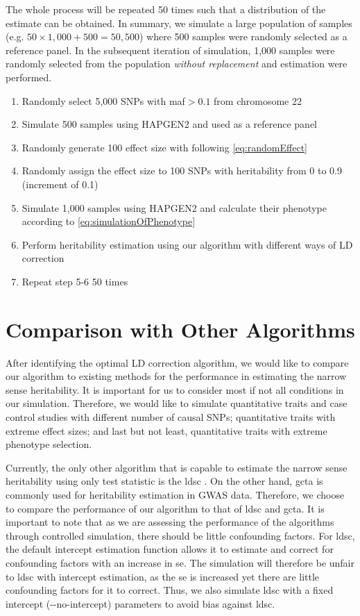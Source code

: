 		The whole process will be repeated 50 times such that a distribution of the estimate can be obtained. 
		In summary, we simulate a large population of samples (e.g. $50\times1,000+500 = 50,500$) where 500 samples were randomly selected as a reference panel. 
		In the subsequent iteration of simulation, 1,000 samples were randomly selected from the population \textit{without replacement} and estimation were performed.
		\begin{enumerate}
			\item Randomly select 5,000 \glspl{SNP} with \gls{maf}$>0.1$ from chromosome 22
			\item Simulate 500 samples using HAPGEN2 and used as a reference panel
			\item Randomly generate 100 effect size with following \cref{eq:randomEffect}
			\item Randomly assign the effect size to 100 \glspl{SNP} with heritability from 0 to 0.9 (increment of 0.1)
			\item Simulate 1,000 samples using HAPGEN2 and calculate their phenotype according to \cref{eq:simulationOfPhenotype} 
			\item Perform heritability estimation using our algorithm with different ways of \gls{LD} correction
			\item Repeat step 5-6 50 times
		\end{enumerate}
		
		\section{Comparison with Other Algorithms}
		After identifying the optimal \gls{LD} correction algorithm, we would like to compare our algorithm to existing methods for the performance in estimating the narrow sense heritability.
		It is important for us to consider most if not all conditions in our simulation. 
		Therefore, we would like to simulate quantitative traits and case control studies with different number of causal \glspl{SNP}; quantitative traits with extreme effect sizes; and last but not least, quantitative traits with extreme phenotype selection.
		
		Currently, the only other algorithm that is capable to estimate the narrow sense heritability using only test statistic is the \gls{ldsc} \citep{Bulik-Sullivan2015}. 
		On the other hand, \gls{gcta} \citep{Yang2011} is commonly used for heritability estimation in \gls{GWAS} data. 
		Therefore, we choose to compare the performance of our algorithm to that of \gls{ldsc} and \gls{gcta}.
		It is important to note that as we are assessing the performance of the algorithms through controlled simulation, there should be little confounding factors. 
		For \gls{ldsc}, the default intercept estimation function allows it to estimate and correct for confounding factors with an increase in \gls{se}. 
		The simulation will therefore be unfair to \gls{ldsc} with intercept estimation, as the \gls{se} is increased yet there are little confounding factors for it to correct.
		Thus, we also simulate \gls{ldsc} with a fixed intercept (-{}-no-intercept) parameters to avoid bias against \gls{ldsc}.	
		
